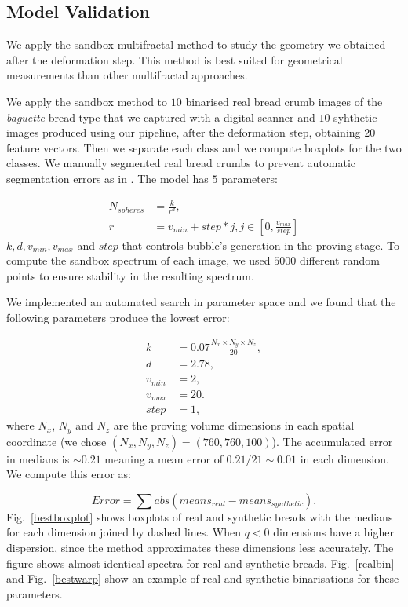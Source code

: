 \documentclass[final,5p,times]{elsarticle}
\begin{document}
{\subsection{Model Validation}

We apply the sandbox multifractal method to study the geometry we obtained after the deformation step. This method is best suited for geometrical measurements than other multifractal approaches.

We apply the sandbox method to $10$ binarised real bread crumb images of the {\em baguette} bread type that we captured with a digital scanner and $10$ syhthetic images produced using our pipeline, after the deformation step, obtaining $20$ feature vectors. Then we separate each class and we compute boxplots for the two classes. We manually segmented real bread crumbs to prevent automatic segmentation errors as in \cite{Bosch2011}. The model has $5$ parameters:


\begin{align}
N_{spheres} &= \frac{k}{r^{d}},\\ r &= v_{min}+step*j, j \in [0,\frac{v_{max}}{step}]
\end{align}
$k,d,v_{min},v_{max}$ and $step$ that controls bubble's generation in the proving stage. To compute the sandbox spectrum of each image, we used $5000$ different random points to ensure stability in the resulting spectrum.

We implemented an automated search in parameter space and we found that the following parameters produce the lowest error:

\begin{align*}
k &= 0.07 \frac{N_{x}\times N_{y}\times N_{z}}{20} ,\\
d &=2.78,\\
v_{min} &=2,\\
v_{max} &=20.\\
step &=1,
\end{align*}
\noindent where $N_{x}$, $N_{y}$ and $N_{z}$ are the proving volume dimensions in each spatial coordinate (we chose $(N_{x},N_{y},N_{z}) = (760,760,100)$). The accumulated error in medians is $\sim 0.21$ meaning a mean error of $0.21/21 \sim 0.01$  in each dimension. We compute this error as:

\begin{equation}
Error = \displaystyle \sum abs(means_{real}-means_{synthetic}).
\end{equation}
Fig.~\ref{bestboxplot} shows boxplots of real and synthetic breads with the medians for each dimension joined by dashed lines. When $q < 0$ dimensions have a higher dispersion, since the method approximates these dimensions less accurately. The figure shows almost identical spectra for real and synthetic breads.  Fig.~\ref{realbin} and  Fig.~\ref{bestwarp} show an example of real and synthetic binarisations for these parameters.

}
\end{document}
